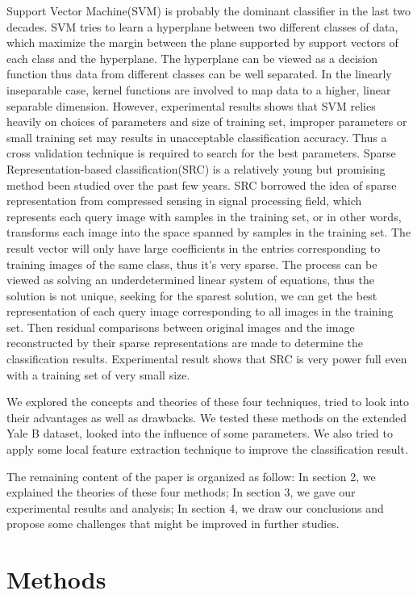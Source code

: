 \documentclass[conference]{IEEEtran}
\begin{document}
Support Vector Machine(SVM) is probably the dominant classifier in the last two decades. SVM tries to learn a hyperplane between two different classes of data, which maximize the margin between the plane supported by support vectors of each class and the hyperplane. The hyperplane can be viewed as a decision function thus data from different classes can be well separated. In the linearly inseparable case, kernel functions are involved to map data to a higher, linear separable dimension. However, experimental results shows that SVM relies heavily on choices of parameters and size of training set, improper parameters or small training set may results in unacceptable classification accuracy. Thus a cross validation technique is required to search for the best parameters. Sparse Representation-based classification(SRC) is a relatively young but promising method been studied over the past few years. SRC borrowed the idea of sparse representation from compressed sensing in signal processing field, which represents each query image with samples in the training set, or in other words, transforms each image into the space spanned by samples in the training set. The result vector will only have large coefficients in the entries corresponding to training images of the same class, thus it's very sparse. The process can be viewed as solving an underdetermined linear system of equations, thus the solution is not unique, seeking for the sparest solution, we can get the best representation of each query image corresponding to all images in the training set. Then residual comparisons between original images and the image reconstructed by their sparse representations are made to determine the classification results. Experimental result shows that SRC is very power full even with a training set of very small size.

We explored the concepts and theories of these four techniques, tried to look into their advantages as well as drawbacks. We tested these methods on the extended Yale B dataset, looked into the influence of some parameters. We also tried to apply some local feature extraction technique to improve the classification result.

The remaining content of the paper is organized as follow: In section 2, we explained the theories of these four methods; In section 3, we gave our experimental results and analysis; In section 4, we draw our conclusions and propose some challenges that might be improved in further studies.


\section{Methods}
\end{document}
